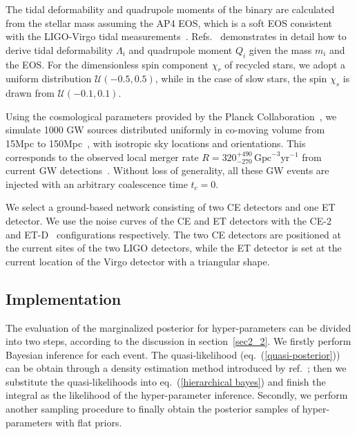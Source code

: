 \documentclass[a4paper,11pt]{article}
\begin{document}
The tidal deformability and quadrupole moments of the binary are calculated from the stellar mass assuming the AP4 EOS, which is a soft EOS consistent with the LIGO-Virgo tidal measurements~\cite{LIGOScientific:2017vwq, LIGOScientific:2018cki, LIGOScientific:2018hze}. Refs.~\cite{Yagi:2013awa, Atta:2024ckt} demonstrates in detail how to derive tidal deformability $\Lambda_i$ and quadrupole moment $Q_i$ given the mass $m_i$ and the EOS. For the dimensionless spin component $\chi_r$ of recycled stars, we adopt a uniform distribution $\mathcal{U}(-0.5,0.5)$, 
while in the case of slow stars, the spin $\chi_s$ is drawn from $\mathcal{U}(-0.1,0.1)$.

Using the cosmological parameters provided by the Planck Collaboration~\cite{Planck:2018vyg}, we simulate 1000 GW sources distributed uniformly in co-moving volume from 15Mpc to 150Mpc~\cite{Fishbach:2018edt, KAGRA:2021duu}, with isotropic sky locations and orientations. This corresponds to the observed local 
merger rate $R=320_{-270}^{+490}\,\mathrm{Gpc}^{-3}\mathrm{yr}^{-1}$ from current GW detections~\cite{LIGOScientific:2020aai}. 
Without loss of generality, all these GW events are injected with an arbitrary coalescence time $t_c=0$.

We select a ground-based network consisting of two CE detectors and one ET detector. We use the noise curves of the CE and ET detectors with the CE-2~\cite{Reitze:2019iox, Reitze:2019dyk} and ET-D~\cite{Punturo:2010zz, Hild:2010id, Sathyaprakash:2012jk} configurations respectively. The two CE detectors are positioned at the current sites of the two LIGO detectors, while the ET detector is set at the current location of the Virgo detector with a triangular shape. 

\subsection{Implementation}
\label{sec3_2}

The evaluation of the marginalized posterior for hyper-parameters can be divided into two steps, according to the discussion in section~\ref{sec2_2}. We firstly perform Bayesian inference for each event. The quasi-likelihood (eq.~(\ref{quasi-posterior})) can be obtain through a density estimation method introduced by ref.~\cite{Talbot:2020oeu}; 
then we substitute the quasi-likelihoods into eq.~(\ref{hierarchical bayes}) and finish the integral as the likelihood of the hyper-parameter inference. Secondly, we perform another sampling procedure to finally obtain the posterior samples of hyper-parameters with flat priors. 
\end{document}
